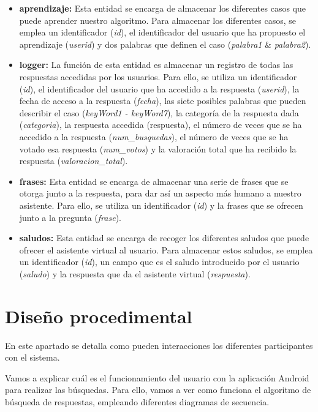\begin{itemize}
	\tightlist
	\item
	\textbf{aprendizaje:} Esta entidad se encarga de almacenar los diferentes casos que puede aprender nuestro algoritmo. Para almacenar los diferentes casos, se emplea un identificador (\textit{id}), el identificador del usuario que ha propuesto el aprendizaje (\textit{userid}) y dos palabras que definen el caso (\textit{palabra1} \& \textit{palabra2}). 
	\item
	\textbf{logger:} La función de esta entidad es almacenar un registro de todas las respuestas accedidas por los usuarios. Para ello, se utiliza un identificador (\textit{id}), el identificador del usuario que ha accedido a la respuesta (\textit{userid}), la fecha de acceso a la respuesta (\textit{fecha}), las siete posibles palabras que pueden describir el caso (\textit{keyWord1 - keyWord7}), la categoría de la respuesta dada (\textit{categoria}), la respuesta accedida (respuesta), el número de veces que se ha accedido a la respuesta (\textit{num\_busquedas}), el número de veces que se ha votado esa respuesta (\textit{num\_votos}) y la valoración total que ha recibido la respuesta (\textit{valoracion\_total}).
	\item 
	\textbf{frases:} Esta entidad se encarga de almacenar una serie de frases que se otorga junto a la respuesta, para dar así un aspecto más humano a nuestro asistente. Para ello, se utiliza un identificador (\textit{id}) y la frases que se ofrecen junto a la pregunta (\textit{frase}).
	\item 
	\textbf{saludos:} Esta entidad se encarga de recoger los diferentes saludos que puede ofrecer el asistente virtual al usuario. Para almacenar estos saludos, se emplea un identificador (\textit{id}), un campo que es el saludo introducido por el usuario (\textit{saludo}) y la respuesta que da el asistente virtual (\textit{respuesta}).
\end{itemize}

\section{Diseño procedimental}

En este apartado se detalla como pueden interacciones los diferentes participantes con el sistema.

Vamos a explicar cuál es el funcionamiento del usuario con la aplicación Android para realizar las búsquedas. Para ello, vamos a ver como funciona el algoritmo de búsqueda de respuestas, empleando diferentes diagramas de secuencia.

